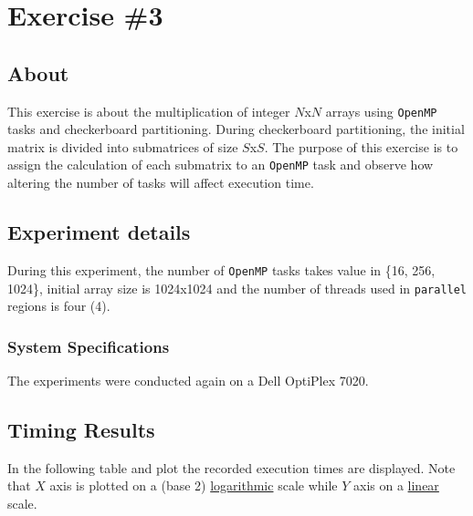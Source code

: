 \documentclass{article}
\def\code#1{\texttt{#1}}
\begin{document}

\section{Exercise \#3}

\subsection{About}
This exercise is about the multiplication of integer $N$x$N$ arrays using \texttt{OpenMP} tasks
and checkerboard partitioning. During checkerboard partitioning, the initial matrix is divided
into submatrices of size $S$x$S$. The purpose of this exercise is to assign the calculation
of each submatrix to an \texttt{OpenMP} task and observe how altering the number of tasks
will affect execution time.

\subsection{Experiment details}
During this experiment, the number of \texttt{OpenMP} tasks takes value in \{16, 256, 1024\},
initial array size is 1024x1024 and the number of threads used in \code{parallel} regions is
four (4).

\subsubsection{System Specifications}
The experiments were conducted again on a Dell OptiPlex 7020.


\subsection{Timing Results}
In the following table and plot the recorded execution times are displayed.
Note that $X$ axis is plotted on a (base 2) \underline{logarithmic} scale while
$Y$ axis on a \underline{linear} scale.

\newpage
\end{document}

